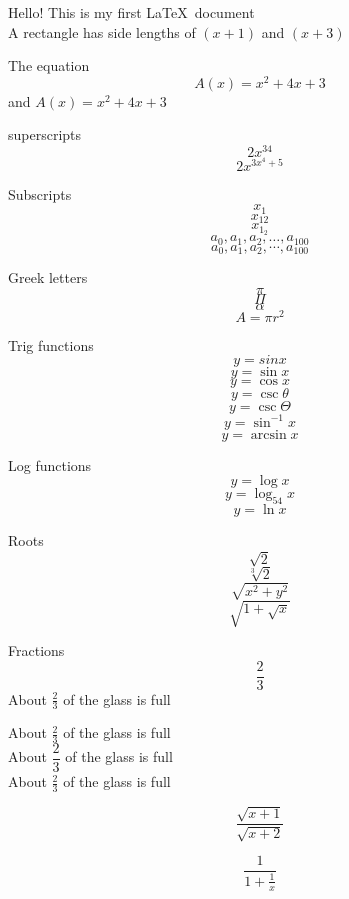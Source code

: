 \documentclass[11pt]{article}
\begin{document}
Hello! This is my first \LaTeX\ document\\
A rectangle has side lengths of $(x+1)$ and $(x+3)$ 

The equation $$A(x) = x^2 + 4x + 3$$
and ${A(x) = x^2 + 4x + 3}$

superscripts $$2x^{34}$$
$$2x^{3x^4 +5 }$$

Subscripts
$$x_1$$
$$x_{12}$$
$$x_{1_2}$$
$$a_0,a_1,a_2,\ldots,a_{100}$$
$$a_0,a_1,a_2,\cdots,a_{100}$$

Greek letters
$$\pi$$
$$\Pi$$
$$\alpha$$
$$ A = \pi r^2$$

Trig functions
$$ y = sin x$$
$$ y = \sin x$$
$$ y = \cos x$$
$$y = \csc \theta$$
$$y = \csc \Theta$$
$$y = \sin^{-1} x$$
$$y = \arcsin x$$

Log functions
$$y = \log x$$
$$y = \log_{54}x$$
$$y=\ln x $$

Roots
$$\sqrt{2}$$
$$\sqrt[3]{2}$$
$$\sqrt{x^2+y^2}$$
$$\sqrt{1+\sqrt{x}}$$

Fractions
$$\frac{2}{3}$$
About $\frac{2}{3}$ of the glass is full

About $\displaystyle\frac{2}{3}$ of the glass is full\\
About $\dfrac{2}{3}$ of the glass is full\\[10pt]
About $\displaystyle\frac{2}{3}$ of the glass is full

$$\frac{\sqrt{x+1}}{\sqrt{x+2}}$$

$$\frac{1}{1+\frac{1}{x}}$$
\end{document}
